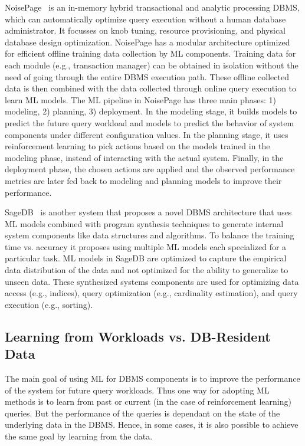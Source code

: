 NoisePage~\cite{noisepage} is an in-memory hybrid transactional and analytic processing DBMS, which can automatically optimize query execution without a human database administrator.
It focusses on knob tuning, resource provisioning, and physical database design optimization.
NoisePage has a modular architecture optimized for efficient offline training data collection by ML components.
Training data for each module (e.g., transaction manager) can be obtained in isolation without the need of going through the entire DBMS execution path.
These offline collected data is then combined with the data collected through online query execution to learn ML models.
The ML pipeline in NoisePage has three main phases: 1) modeling, 2) planning, 3) deployment.
In the modeling stage, it builds models to predict the future query workload and models to predict the behavior of system components under different configuration values.
In the planning stage, it uses reinforcement learning to pick actions based on the models trained in the modeling phase, instead of interacting with the actual system.
Finally, in the deployment phase, the chosen actions are applied and the observed performance metrics are later fed back to modeling and planning models to improve their performance.

SageDB~\cite{sagedb} is another system that proposes a novel DBMS architecture that uses ML models combined with program synthesis techniques to generate internal system components like data structures and algorithms.
To balance the training time vs. accuracy it proposes using multiple ML models each specialized for a particular task.
ML models in SageDB are optimized to capture the empirical data distribution of the data and not optimized for the ability to generalize to unseen data.
These synthesized systems components are used for optimizing data access (e.g., indices), query optimization (e.g., cardinality estimation), and query execution (e.g., sorting).


\subsection{Learning from Workloads vs. DB-Resident Data} 
The main goal of using ML for DBMS components is to improve the performance of the system for future query workloads.
Thus one way for adopting ML methods is to learn from past or current (in the case of reinforcement learning) queries.
But the performance of the queries is dependant on the state of the underlying data in the DBMS.
Hence, in some cases, it is also possible to achieve the same goal by learning from the data.

